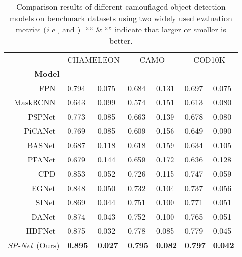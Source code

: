 \documentclass[10pt,twocolumn,letterpaper]{article}
\def\ie{\emph{i.e.}}
\def\ours{\emph{SP-Net}}
\begin{document}
\begin{table}[t!]
  \centering
  \renewcommand{\arraystretch}{1.25}
  \caption{Comparison results of different camouflaged object detection models on benchmark datasets using two widely used evaluation metrics (\ie,  \cite{fan2017structure} and  \cite{perazzi2012saliency}).
  ```` \& ``'' indicate that larger or smaller is better. 
  }\scriptsize
  \begin{tabular}{r|p{0.4cm}p{0.4cm}|p{0.5cm}p{0.5cm}|p{0.5cm}p{0.5cm}}
  \hline\toprule

    &\multicolumn{2}{c|}{CHAMELEON}
    &\multicolumn{2}{c|}{CAMO}
    &\multicolumn{2}{c}{COD10K}\\

    \textbf{Model}
    & &
    & &
    & & \\

    \midrule
    FPN~\cite{fpn}

    & 0.794  & 0.075
    & 0.684  & 0.131
    & 0.697  & 0.075 \\

    MaskRCNN~\cite{maskrcnn}
    & 0.643  & 0.099
    & 0.574  & 0.151
    & 0.613  & 0.080 \\

    PSPNet~\cite{pspnet}
    & 0.773 & 0.085
    & 0.663 & 0.139
    & 0.678 & 0.080 \\

    PiCANet~\cite{picanet}
    & 0.769 & 0.085
    & 0.609 & 0.156
    & 0.649 & 0.090 \\

    BASNet~\cite{basnet}
    & 0.687 & 0.118
    & 0.618 & 0.159
    & 0.634 & 0.105 \\

    PFANet~\cite{pfanet}
    & 0.679 & 0.144
    & 0.659 & 0.172
    & 0.636 & 0.128 \\

    CPD~\cite{cpd}
    & 0.853 & 0.052
    & 0.726 & 0.115
    & 0.747 & 0.059 \\

    EGNet~\cite{egnet}
    & 0.848 & 0.050
    & 0.732 & 0.104
    & 0.737 & 0.056 \\

    SINet~\cite{fan2021concealed}
    & 0.869 & 0.044
    & 0.751 & 0.100
    & 0.771 & 0.051 \\

    \midrule
    DANet~\cite{zhao2020single}
    & 0.874 & 0.043
    & 0.752 & 0.100
    & 0.765 & 0.051 \\

    HDFNet~\cite{pang2020hierarchical}
    & 0.875 & 0.032
    & 0.778 & 0.085
    & 0.779 & 0.045 \\

    \midrule

    \ours~(Ours)
    &  \textbf{0.895}  & \textbf{0.027}
    &  \textbf{0.795}  & \textbf{0.082}
    &  \textbf{0.797}  & \textbf{0.042} \\


  \bottomrule
  \hline
  \end{tabular}\label{tab7}
\end{table}
\end{document}
